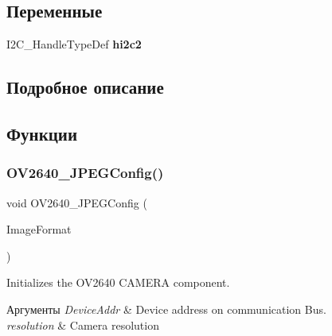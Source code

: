 \subsection*{Переменные}
\begin{DoxyCompactItemize}
\item 
\mbox{\label{group___o_v2640___exported___functions_gac379bcc152d860f08b1279fd3e232295}} 
I2\+C\+\_\+\+Handle\+Type\+Def {\bfseries hi2c2}
\end{DoxyCompactItemize}


\subsection{Подробное описание}


\subsection{Функции}
\mbox{\label{group___o_v2640___exported___functions_gab8212120406cb75db2b159188d708160}} 
\subsubsection{\texorpdfstring{O\+V2640\+\_\+\+J\+P\+E\+G\+Config()}{OV2640\_JPEGConfig()}}
{\footnotesize\ttfamily void O\+V2640\+\_\+\+J\+P\+E\+G\+Config (\begin{DoxyParamCaption}\item[{Image\+Format\+\_\+\+Type\+Def}]{Image\+Format }\end{DoxyParamCaption})}



Initializes the O\+V2640 C\+A\+M\+E\+RA component. 


\begin{DoxyParams}{Аргументы}
{\em Device\+Addr} & Device address on communication Bus. \\
\hline
{\em resolution} & Camera resolution \\
\hline
\end{DoxyParams}

